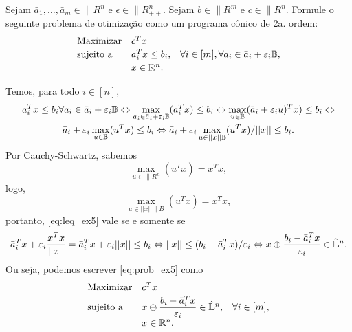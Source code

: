 \begin{homeworkProblem}
Sejam $\bar{a}_1, \dots, \bar{a}_m \in \|{R}^n$ e $\epsilon \in \|{R}_{++}^n$. Sejam $b \in \|{R}^m$ e $c \in \|{R}^n$. Formule o seguinte problema de otimização como um programa cônico de 2a. ordem:
\begin{equation} \label{eq:prob_ex5}
    \begin{array}[!h]{lll}
        \text{Maximizar} & c^Tx                     & \\[2pt]
        \text{sujeito a} & a_i^Tx \leq b_i,         & \forall i \in [m], \forall a_i \in \bar{a}_i + \varepsilon_i \|{B}, \\[2pt]
                         & x \in \|{R}^n.           & \\
    \end{array}
\end{equation}
\end{homeworkProblem}

\begin{homeworkProblemAnswer}
Temos, para todo $i \in [n]$, 
\begin{multline} \label{eq:leq_ex5}
    a_i^Tx \leq b_i \forall a_i \in \bar{a}_i + \varepsilon_i \mathbb{B} \Leftrightarrow 
    \max \limits_{a_i \in \bar{a}_i + \varepsilon_i\mathbb{B}}(a_i^Tx) \leq b_i \Leftrightarrow
    \max \limits_{u \in \mathbb{B}}(\bar{a}_i + \varepsilon_iu)^Tx) \leq b_i \Leftrightarrow \\
    \bar{a}_i + \varepsilon_i \max \limits_{u \in \mathbb{B}}(u^Tx) \leq b_i \Leftrightarrow
    \bar{a}_i + \varepsilon_i \max \limits_{u \in ||x||\mathbb{B}}(u^Tx)/||x|| \leq b_i.
\end{multline}
Por Cauchy-Schwartz, sabemos
$$ \max \limits_{u \in \|{R}^n}(u^Tx) = x^Tx, $$
logo,
$$ \max \limits_{u \in ||x||\|{B}}(u^Tx) = x^Tx,$$
portanto, \eqref{eq:leq_ex5} vale se e somente se
$$ 
    \bar{a}_i^Tx + \varepsilon_i \dfrac{x^Tx}{||x||} = \bar{a}_i^Tx + \varepsilon_i||x|| \leq b_i \Leftrightarrow
    ||x|| \leq (b_i - \bar{a}_i^Tx)/\varepsilon_i \Leftrightarrow
    x \oplus \dfrac{b_i - \bar{a}_i^Tx}{\varepsilon_i} \in \hat{\mathbb{L}}^n.
$$
Ou seja, podemos escrever \eqref{eq:prob_ex5} como 
\begin{equation*}
    \begin{array}[!h]{lll}
        \text{Maximizar} & c^Tx                                                                      & \\[2pt]
        \text{sujeito a} & x \oplus \dfrac{b_i - \bar{a}_i^Tx}{\varepsilon_i} \in \hat{\|{L}}^n,     & \forall i \in [m], \\[2pt]
                         & x \in \|{R}^n.                                                              & \\
    \end{array}
\end{equation*}
\end{homeworkProblemAnswer}

